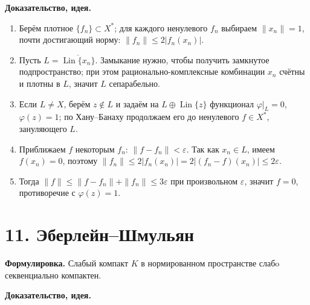 \documentclass[10pt,a4paper]{article}
\newcommand{\X}{X}
\newcommand{\Lin}{\operatorname{Lin}}
\begin{document}
	\textbf{Доказательство, идея.}
	\begin{enumerate}
		\item Берём плотное $\{f_n\}\subset\X^\ast$; для каждого ненулевого $f_n$ выбираем $\|x_n\|=1$, почти достигающий норму: $\|f_n\|\le2|f_n(x_n)|$.
		\item Пусть $L=\overline{\Lin\{x_n\}}$. Замыкание нужно, чтобы получить замкнутое подпространство; при этом рационально-комплексные комбинации $x_n$ счётны и плотны в $L$, значит $L$ сепарабельно.
		\item Если $L\ne\X$, берём $z\notin L$ и задаём на $L\oplus\Lin\{z\}$ функционал $\varphi|_L=0$, $\varphi(z)=1$; по Хану--Банаху продолжаем его до ненулевого $f\in\X^\ast$, зануляющего $L$.
		\item Приближаем $f$ некоторым $f_n$: $\|f-f_n\|<\varepsilon$. Так как $x_n\in L$, имеем $f(x_n)=0$, поэтому $\|f_n\|\le2|f_n(x_n)|=2|(f_n-f)(x_n)|\le2\varepsilon$.
		\item Тогда $\|f\|\le\|f-f_n\|+\|f_n\|\le3\varepsilon$ при произвольном $\varepsilon$, значит $f=0$, противоречие с $\varphi(z)=1$.
	\end{enumerate}

	\section*{11. Эберлейн--Шмульян}
	\textbf{Формулировка.} Слабый компакт $K$ в нормированном пространстве слабo секвенциально компактен.

	\textbf{Доказательство, идея.}
\end{document}
